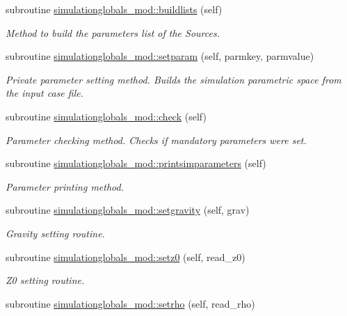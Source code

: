 \begin{DoxyCompactItemize}
subroutine \mbox{\hyperlink{namespacesimulationglobals__mod_a20a4476e2a8dbec4c1aaa202a14b4a40}{simulationglobals\+\_\+mod\+::buildlists}} (self)
\begin{DoxyCompactList}\small\item\em Method to build the parameters list of the Sources. \end{DoxyCompactList}\item 
subroutine \mbox{\hyperlink{namespacesimulationglobals__mod_ada0b6ffc5e112afbd86cdaa8d9aa55d8}{simulationglobals\+\_\+mod\+::setparam}} (self, parmkey, parmvalue)
\begin{DoxyCompactList}\small\item\em Private parameter setting method. Builds the simulation parametric space from the input case file. \end{DoxyCompactList}\item 
subroutine \mbox{\hyperlink{namespacesimulationglobals__mod_a3d337e9c28136dd9c67fa576f05cd44b}{simulationglobals\+\_\+mod\+::check}} (self)
\begin{DoxyCompactList}\small\item\em Parameter checking method. Checks if mandatory parameters were set. \end{DoxyCompactList}\item 
subroutine \mbox{\hyperlink{namespacesimulationglobals__mod_ab67964fe7c3fb20a4ce0b4193520aa1d}{simulationglobals\+\_\+mod\+::printsimparameters}} (self)
\begin{DoxyCompactList}\small\item\em Parameter printing method. \end{DoxyCompactList}\item 
subroutine \mbox{\hyperlink{namespacesimulationglobals__mod_ae6b88d15ddc389aedd73d600de0337df}{simulationglobals\+\_\+mod\+::setgravity}} (self, grav)
\begin{DoxyCompactList}\small\item\em Gravity setting routine. \end{DoxyCompactList}\item 
subroutine \mbox{\hyperlink{namespacesimulationglobals__mod_a36c2833caae3767434115cc966fe2c5d}{simulationglobals\+\_\+mod\+::setz0}} (self, read\+\_\+z0)
\begin{DoxyCompactList}\small\item\em Z0 setting routine. \end{DoxyCompactList}\item 
subroutine \mbox{\hyperlink{namespacesimulationglobals__mod_a7d41fc05216d326ae8c0b090362430d3}{simulationglobals\+\_\+mod\+::setrho}} (self, read\+\_\+rho)

\end{DoxyCompactItemize}
